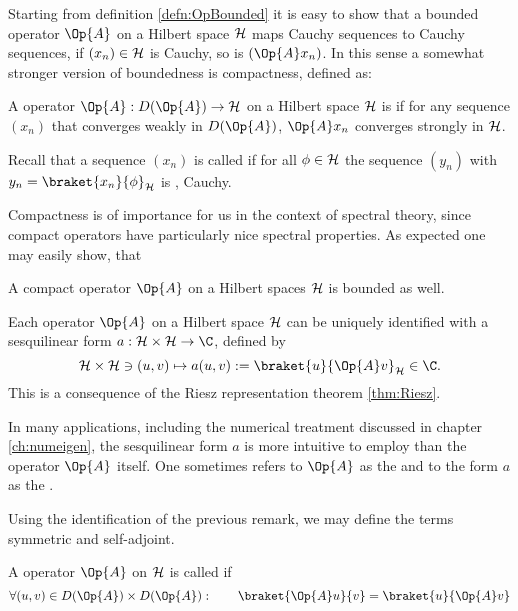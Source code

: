 Starting from definition \ref{defn:OpBounded}
it is easy to show that a bounded operator $\Op{A}$ on a Hilbert
space $\mathcal{H}$ maps Cauchy sequences to Cauchy sequences,
\ie if $(x_n) \in \mathcal{H}$ is Cauchy, so is $(\Op{A} x_n)$.
In this sense a somewhat stronger version of boundedness
is compactness, defined as:
\begin{defn}
	A operator $\Op{A} : D(\Op{A}) \to \hilbert$ on a Hilbert space $\mathcal{H}$
	is 
	if for any sequence $(x_n)$ that converges weakly in $D(\Op{A})$,
	$\Op{A} x_n$ converges strongly in $\mathcal{H}$.

	Recall that a sequence $(x_n)$ is called 
	if for all $\phi \in \mathcal{H}$ the sequence $(y_n)$ with
	$y_n = \braket{x_n}{\phi}_\hilbert$
	is , \ie Cauchy.
\end{defn}
Compactness is of importance for us in the context of spectral theory,
since compact operators have particularly nice spectral properties.
As expected one may easily show, that~
\begin{prop}
	A compact operator $\Op{A}$ on a Hilbert spaces $\mathcal{H}$ is bounded as well.
\end{prop}

\begin{rem}
\label{rem:OpRietz}
Each operator $\Op{A}$ on a Hilbert space $\mathcal{H}$ can be
uniquely identified with a sesquilinear form
$a : \hilbert \times \hilbert \to \C$, defined by
\begin{equation}
	\hilbert \times \hilbert \ni (u, v) \mapsto a(u, v) := \braket{u}{\Op{A} v}_\hilbert \in \C.
	\label{eqn:formA}
\end{equation}
This is a consequence of the Riesz representation theorem \vref{thm:Riesz}.

In many applications, including the numerical treatment discussed in chapter
\vref{ch:numeigen},
the sesquilinear form $a$ is more intuitive to employ than the operator $\Op{A}$ itself.
One sometimes refers to $\Op{A}$ as the 
and to the form $a$ as the .
\end{rem}

Using the identification of the previous remark,
we may define the terms symmetric and self-adjoint.
\begin{defn}
	\label{def:SymmetricOperator}
	A operator $\Op{A}$ on $\mathcal{H}$ is called  if
	\[ \forall (u, v) \in D(\Op{A}) \times D(\Op{A}): \qquad \braket{\Op{A} u}{v} = \braket{u}{\Op{A} v} \]
\end{defn}

